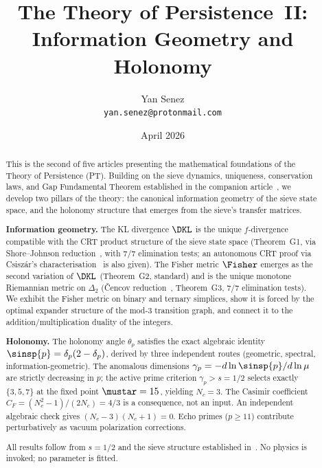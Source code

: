 \documentclass[12pt,a4paper]{article}
\title{\textbf{The Theory of Persistence~II:\\Information Geometry and Holonomy}}
\author{Yan Senez\\\texttt{yan.senez@protonmail.com}}
\date{April 2026}
\begin{document}
\maketitle

\begin{abstract}
This is the second of five articles presenting the mathematical
foundations of the Theory of Persistence (PT).  Building on the sieve
dynamics, uniqueness, conservation laws, and Gap Fundamental Theorem
established in the companion article~\cite{companion_M1}, we develop
two pillars of the theory: the canonical information geometry of the
sieve state space, and the holonomy structure that emerges from the
sieve's transfer matrices.

\textbf{Information geometry.}
The KL divergence $\DKL$ is the unique $f$-divergence compatible with
the CRT product structure of the sieve state space (Theorem~G1, via
Shore--Johnson reduction~\cite{ShoreJohnson1980}, with 7/7 elimination
tests; an autonomous CRT proof via Csisz\'ar's
characterisation~\cite{Csiszar1967} is also given).  The Fisher metric
$\Fisher$ emerges as the second variation of $\DKL$ (Theorem~G2,
standard) and is the unique monotone Riemannian metric on $\Delta_2$
(\v{C}encov reduction~\cite{Cencov1982}, Theorem~G3, 7/7 elimination
tests).  We exhibit the Fisher metric on binary and ternary simplices,
show it is forced by the optimal expander structure of the mod-3
transition graph, and connect it to the addition/multiplication duality
of the integers.

\textbf{Holonomy.}
The holonomy angle $\theta_p$ satisfies the exact algebraic identity
$\sinsp{p} = \delta_p(2 - \delta_p)$, derived by three independent
routes (geometric, spectral, information-geometric).  The anomalous
dimensions $\gamma_p = -d\ln\sinsp{p}/d\ln\mu$ are strictly decreasing
in $p$; the active prime criterion $\gamma_p > s = 1/2$ selects exactly
$\{3, 5, 7\}$ at the fixed point $\mustar = 15$, yielding $N_c = 3$.
The Casimir coefficient $C_F = (N_c^2 - 1)/(2N_c) = 4/3$ is a
consequence, not an input.  An independent algebraic check gives
$(N_c - 3)(N_c + 1) = 0$.  Echo primes ($p \geq 11$) contribute
perturbatively as vacuum polarization corrections.

All results follow from $s = 1/2$ and the sieve structure established
in~\cite{companion_M1}.  No physics is invoked; no parameter is fitted.
\end{abstract}

\tableofcontents
\newpage

\end{document}
